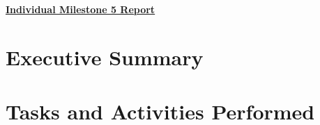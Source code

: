 \documentclass{article}
\begin{document}
\pagestyle{headings}

\begin{center}
{\LARGE\textbf{\underline{{Individual Milestone 5 Report}}}}
\end{center}

\section*{Executive Summary}


\section*{Tasks and Activities Performed}
\end{document}
